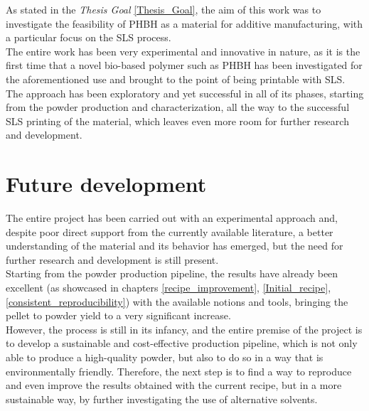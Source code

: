 \documentclass{article}
\begin{document}
    As stated in the \textit{Thesis Goal} \ref{Thesis_Goal}, the aim of this work was to investigate the feasibility of PHBH as a 
    material for additive manufacturing, with a particular focus on the SLS process. \\ 

    The entire work has been very experimental and innovative in nature, as it is the first time that a novel bio-based polymer such as PHBH has been investigated 
    for the aforementioned use and brought to the point of being printable with SLS. \\
    
    The approach has been exploratory and yet successful in all of its phases, starting from the powder production and characterization, all the way to the successful 
    SLS printing of the material, which leaves even more room for further research and development. 
    

    \clearpage
    \section{Future development\label{Future_development_and_research}}

    The entire project has been carried out with an experimental approach and, despite poor direct support 
    from the currently available literature, a better understanding of 
    the material and its behavior has emerged, but the need for further research and development is still 
    present. \\ 

    Starting from the powder production pipeline, the results have already been excellent (as showcased in chapters \ref{recipe_improvement}, \ref{Initial_recipe}, 
    \ref{consistent_reproducibility}) with the available notions and tools, bringing the pellet to powder yield to 
    a very significant increase. \\ 

    However, the process is still in its infancy, and the entire premise of the project is to develop a sustainable 
    and cost-effective production pipeline, which is not only able to produce a high-quality powder, but also 
    to do so in a way that is environmentally friendly. Therefore, the next step is to find a way to reproduce and 
    even improve the results obtained with the current recipe, but in a more sustainable way, by further 
    investigating the use of alternative solvents. \\ 
\end{document}
